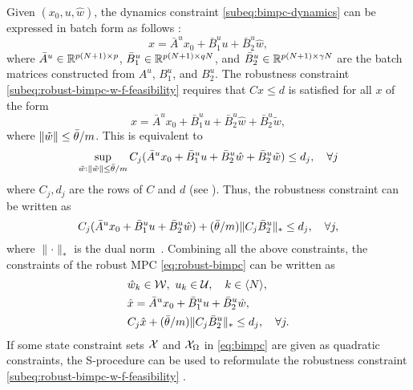 Given $(x_0, u, \hat{w})$, the dynamics constraint \eqref{subeq:bimpc-dynamics} can be expressed in batch form as follows \cite[Sec.~8.2]{borrelli2017predictive}:
\begin{equation*}
    x = \bar{A}^u x_0 + \bar{B}^u_1 u + \bar{B}^u_2 \hat{w},
\end{equation*}
where $\bar{A}^u \in \mathbb{R}^{p(N+1) \times p}$, $\bar{B}^u_1 \in \mathbb{R}^{p(N+1) \times qN}$, and $\bar{B}^u_2 \in \mathbb{R}^{p(N+1) \times \gamma N}$ are the batch matrices constructed from $A^u$, $B^u_1$, and $B^u_2$.
The robustness constraint \eqref{subeq:robust-bimpc-w-f-feasibility} requires that $C x \leq d$ is satisfied for all $x$ of the form
\begin{equation*}
    x = \bar{A}^u x_0 + \bar{B}^u_1 u + \bar{B}^u_2 \hat{w} + \bar{B}^u_2 \tilde{w},
\end{equation*}
where $\lVert \tilde{w}\rVert \leq \bar{\theta}/m$.
This is equivalent to
\begin{equation*}
    \sup_{\tilde{w}: \lVert \tilde{w}\rVert \leq \bar{\theta}/m} C_j (\bar{A}^u x_0 + \bar{B}^u_1 u + \bar{B}^u_2 \hat{w} + \bar{B}^u_2 \tilde{w}) \leq d_j, \quad \forall j
\end{equation*}
where $C_j, d_j$ are the rows of $C$ and $d$ (see \cite[Sec.~6.4]{boyd2004convex}).
Thus, the robustness constraint can be written as
\begin{equation*}
    C_j (\bar{A}^u x_0 + \bar{B}^u_1 u + \bar{B}^u_2 \hat{w}) + (\bar{\theta}/m)\lVert C_j \bar{B}^u_2\rVert_* \leq d_j, \quad \forall j,
\end{equation*}
where $\lVert \cdot \rVert_*$ is the dual norm~\cite[App.~A.1.6]{boyd2004convex}.
Combining all the above constraints, the constraints of the robust MPC \eqref{eq:robust-bimpc} can be written as
\begin{subequations}
\begin{align}
    & \hat{w}_k \in \mathcal{W}, \ u_k \in \mathcal{U}, \quad k \in \langle N \rangle, \\
    & \hat{x} = \bar{A}^u x_0 + \bar{B}^u_1 u + \bar{B}^u_2 \hat{w}, \\
    & C_j \hat{x} + (\bar{\theta}/m)\lVert C_j \bar{B}^u_2\rVert_* \leq d_j, \quad \forall j.
\end{align}
\end{subequations}
If some state constraint sets $\mathcal{X}$ and $\mathcal{X}_\Omega$ in \eqref{eq:bimpc} are given as quadratic constraints, the S-procedure can be used to reformulate the robustness constraint \eqref{subeq:robust-bimpc-w-f-feasibility} \cite[App.~B]{boyd2004convex}.



